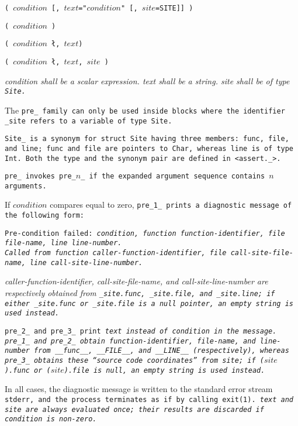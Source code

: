
\s\s\s\tt{(} $condition$
 [\tt{,} $text$\tt{="}$condition$\tt{"}
 [\tt{,} $site$\tt{=SITE}]] \tt{)}

\s\tt{(} $condition$ \tt{)}

\s\tt{(} $condition$
\l\tt{,} $text$\r \tt{)}

\s\tt{(} $condition$
\l\tt{,} $text$\r
  \tt{,} $site$ \tt{)}


\it{condition} shall be a scalar expression.
\it{text} shall be a string.
\it{site} shall be of type \tt{Site}.

The \tt{pre_} family can only be used inside blocks where the
identifier \tt{_site} refers to a variable of type \tt{Site}.

\note \tt{Site_} is a synonym for \tt{struct Site} having three
members: \tt{func}, \tt{file}, and \tt{line}; \tt{func} and \tt{file}
are pointers to \tt{Char}, whereas \tt{line} is of type \tt{Int}.
Both the type and the synonym pair are defined in \tt{<assert._>}.


\tt{pre_} invokes \tt{pre_}$n$\_ if the
expanded argument sequence contains $n$ arguments.

If $condition$ compares equal to zero, \tt{pre_1_}
prints a diagnostic message of the following form:

\begin{center}
\tt{Pre-condition failed:} \it{condition}\tt{, function}
\it{function-identifier}\tt{, file}
\it{file-name}\tt{, line}
\it{line-number}\tt{.}\\\indent
\tt{Called from function}
\it{caller-function-identifier}\tt{, file}
\it{call-site-file-name}\tt{, line}
\it{call-site-line-number}\tt{.}
\end{center}

\it{caller-function-identifier}, \it{call-site-file-name}, and
\it{call-site-line-number} are respectively obtained from \tt{_site.func},
\tt{_site.file}, and \tt{_site.line}; if either \tt{_site.func} or
\tt{_site.file} is a null pointer, an empty string is used instead.

\tt{pre_2_} and \tt{pre_3_} print \it{text}
instead of \it{condition} in the message.
\tt{pre_1_} and \tt{pre_2_} obtain \it{function-identifier}, \it{file-name},
and \it{line-number} from \tt{__func__}, \tt{__FILE__}, and \tt{__LINE__}
(respectively), whereas \tt{pre_3_} obtains these ``source code
coordinates'' from \it{site}; if \tt{(}$site$\tt{).func} or
\tt{(}$site$\tt{).file} is null, an empty string is used instead.

In all cases, the diagnostic message is written to the standard error stream
\tt{stderr}, and the process terminates as if by calling \tt{exit(1)}.
\it{text} and \it{site} are always evaluated once;
their results are discarded if \it{condition} is non-zero.
